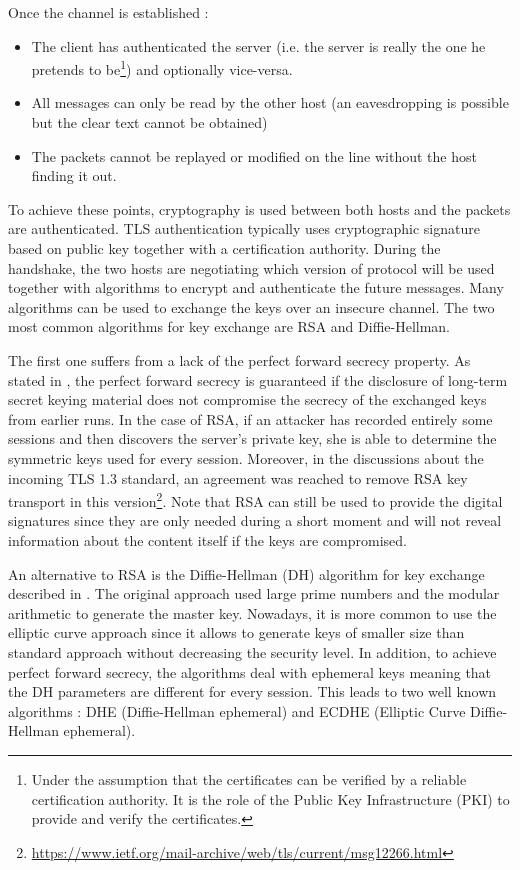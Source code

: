 Once the channel is established :
\begin{itemize}
\item The client has authenticated the server (i.e. the server is really the one he pretends to be\footnote{Under the assumption that the certificates can be verified by a reliable certification authority. It is the role of the Public Key Infrastructure (PKI) to provide and verify the certificates.}) and optionally vice-versa.
\item All messages can only be read by the other host (an eavesdropping is possible but the clear text cannot be obtained)
\item The packets cannot be replayed or modified on the line without the host finding it out.
\end{itemize}

To achieve these points, cryptography is used between both hosts and the packets are authenticated. TLS authentication typically uses cryptographic signature based on public key together with a certification authority. During the handshake, the two hosts are negotiating which version of protocol will be used together with algorithms to encrypt and authenticate the future messages. Many algorithms can be used to exchange the keys over an insecure channel. The two most common algorithms for key exchange are RSA and Diffie-Hellman.

The first one suffers from a lack of the perfect forward secrecy property. As stated in \cite{diffie1992authentication}, the perfect forward secrecy is guaranteed if the disclosure of long-term secret keying material does not compromise the secrecy of the exchanged keys from earlier runs. In the case of RSA, if an attacker has recorded entirely some sessions and then discovers the server's private key, she is able to determine the symmetric keys used for every session. Moreover, in the discussions about the incoming TLS 1.3 standard, an agreement was reached to remove RSA key transport in this version\footnote{\url{https://www.ietf.org/mail-archive/web/tls/current/msg12266.html}}. Note that RSA can still be used to provide the digital signatures since they are only needed during a short moment and will not reveal information about the content itself if the keys are compromised.

An alternative to RSA is the Diffie-Hellman (DH) algorithm for key exchange described in \cite{diffie1976new}. The original approach used large prime numbers and the modular arithmetic to generate the master key. Nowadays, it is more common to use the elliptic curve approach since it allows to generate keys of smaller size than standard approach without decreasing the security level. In addition, to achieve perfect forward secrecy, the algorithms deal with ephemeral keys meaning that the DH parameters are different for every session. This leads to two well known algorithms : DHE (Diffie-Hellman ephemeral) and ECDHE (Elliptic Curve Diffie-Hellman ephemeral).

